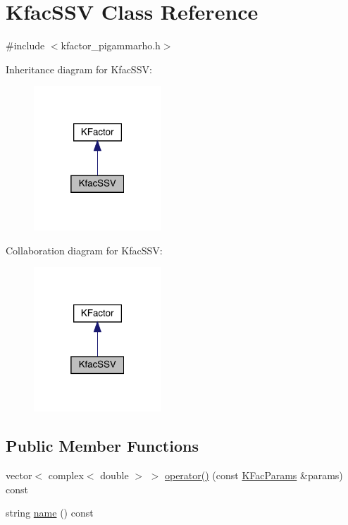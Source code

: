 \hypertarget{classKfacSSV}{}\section{Kfac\+S\+SV Class Reference}
\label{classKfacSSV}


{\ttfamily \#include $<$kfactor\+\_\+pigammarho.\+h$>$}



Inheritance diagram for Kfac\+S\+SV\+:\nopagebreak
\begin{figure}[H]
\begin{center}
\leavevmode
\includegraphics[width=136pt]{df/dda/classKfacSSV__inherit__graph}
\end{center}
\end{figure}


Collaboration diagram for Kfac\+S\+SV\+:\nopagebreak
\begin{figure}[H]
\begin{center}
\leavevmode
\includegraphics[width=136pt]{de/da3/classKfacSSV__coll__graph}
\end{center}
\end{figure}
\subsection*{Public Member Functions}
\begin{DoxyCompactItemize}
\item 
vector$<$ complex$<$ double $>$ $>$ \mbox{\hyperlink{classKfacSSV_aeea4f3f068452d233d4111d72c05cd4f}{operator()}} (const \mbox{\hyperlink{classKFacParams}{K\+Fac\+Params}} \&params) const
\item 
string \mbox{\hyperlink{classKfacSSV_a72d5e577525fa97365dbcfd4c5bea88d}{name}} () const
\end{DoxyCompactItemize}


